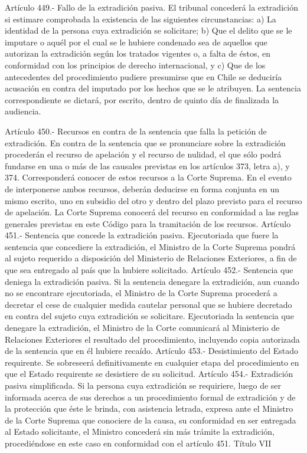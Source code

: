     Artículo 449.- Fallo de la extradición pasiva. El tribunal concederá la extradición si estimare comprobada la existencia de las siguientes circunstancias:
    a) La identidad de la persona cuya extradición se solicitare;
    b) Que el delito que se le imputare o aquél por el cual se le hubiere condenado sea de aquellos que autorizan la extradición según los tratados vigentes o, a falta de éstos, en conformidad con los principios de derecho internacional, y
    c) Que de los antecedentes del procedimiento pudiere presumirse que en Chile se deduciría acusación en contra del imputado por los hechos que se le atribuyen.
    La sentencia correspondiente se dictará, por escrito, dentro de quinto día de finalizada la audiencia.

    Artículo 450.- Recursos en contra de la sentencia que falla la petición de extradición. En contra de la sentencia que se pronunciare sobre la extradición procederán el recurso de apelación y el recurso de nulidad, el que sólo podrá fundarse en una o más de las causales previstas en los artículos 373, letra a), y 374. Corresponderá conocer de estos recursos a la Corte Suprema.
    En el evento de interponerse ambos recursos, deberán deducirse en forma conjunta en un mismo escrito, uno en subsidio del otro y dentro del plazo previsto para el recurso de apelación.
    La Corte Suprema conocerá del recurso en conformidad a las reglas generales previstas en este Código para la tramitación de los recursos.
    Artículo 451.- Sentencia que concede la extradición pasiva. Ejecutoriada que fuere la sentencia que concediere la extradición, el Ministro de la Corte Suprema pondrá al sujeto requerido a disposición del Ministerio de Relaciones Exteriores, a fin de que sea entregado al país que la hubiere solicitado.
    Artículo 452.- Sentencia que deniega la extradición pasiva. Si la sentencia denegare la extradición, aun cuando no se encontrare ejecutoriada, el Ministro de la Corte Suprema procederá a decretar el cese de cualquier medida cautelar personal que se hubiere decretado en contra del sujeto cuya extradición se solicitare.
    Ejecutoriada la sentencia que denegare la extradición, el Ministro de la Corte comunicará al Ministerio de Relaciones Exteriores el resultado del procedimiento, incluyendo copia autorizada de la sentencia que en él hubiere recaído.
    Artículo 453.- Desistimiento del Estado requirente. Se sobreseerá definitivamente en cualquier etapa del procedimiento en que el Estado requirente se desistiere de su solicitud.
    Artículo 454.- Extradición pasiva simplificada. Si la persona cuya extradición se requiriere, luego de ser informada acerca de sus derechos a un procedimiento formal de extradición y de la protección que éste le brinda, con asistencia letrada, expresa ante el Ministro de la Corte Suprema que conociere de la causa, su conformidad en ser entregada al Estado solicitante, el Ministro concederá sin más trámite la extradición, procediéndose en este caso en conformidad con el artículo 451.
    Título VII

